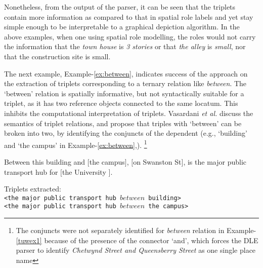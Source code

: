 \documentclass[letter]{sig-alternate}
\begin{document}
Nonetheless, from the output of the parser, it can be seen that the triplets contain more information as compared to that in spatial role labels and yet stay simple enough to be interpretable to a graphical depiction algorithm. In the above examples, when one using spatial role modelling, the roles would not carry the information that the \textit{town house} is \textit{3 stories} or that \textit{the alley} is \textit{small}, nor that the construction site is small.

The next example, Example-\ref{ex:between}, indicates success of the approach on the extraction of triplets corresponding to a ternary relation like \textit{between}. 
The `between' relation is spatially informative, but not syntactically suitable for a triplet, as it has two reference objects connected to the same locatum. 
This inhibits the computational interpretation of triplets. Vasardani \textit{et al.} \cite{maria:descriptions} discuss the semantics of triplet relations, and propose that triples with `between' can be broken into two, by identifying the conjuncts of the dependent (e.g., `building' and `the campus' in Example-\ref{ex:between},).
\footnote{The conjuncts were not separately identified for \textit{between} relation in Example-\ref{tuwex1} because of the presence of the connector `and', which forces the DLE parser to identify \textit{Chetwynd Street and Queensberry Street} as one single place name}
\begin{example}
\label{ex:between}
Between this building and $[$the campus$]$, $[$on Swanston St$]$, is the major public transport hub for $[$the University $]$. 
\end{example}
Triplets extracted:\\
\texttt{<the major public transport hub $between$  building>} \\
\texttt{<the major public transport hub $between$  the campus>} \\
\end{document}
